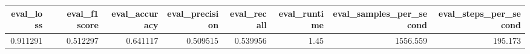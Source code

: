 \begin{tabular}{rrrrrrrr}
\toprule
 eval\_loss &  eval\_f1 score &  eval\_accuracy &  eval\_precision &  eval\_recall &  eval\_runtime &  eval\_samples\_per\_second &  eval\_steps\_per\_second \\
\midrule
  0.911291 &       0.512297 &       0.641117 &        0.509515 &     0.539956 &          1.45 &                 1556.559 &                195.173 \\
\bottomrule
\end{tabular}
